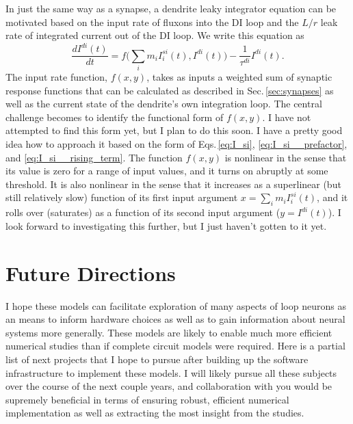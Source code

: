 \documentclass[]{article}
\begin{document}
In just the same way as a synapse, a dendrite leaky integrator equation can be motivated based on the input rate of fluxons into the DI loop and the $L/r$ leak rate of integrated current out of the DI loop. We write this equation as 
\begin{equation}
\label{eq:I_dr}
\frac{dI^{di}(t)}{dt} = f\bigg(\sum_i m_i I_i^{si}(t),I^{di}(t)\bigg)-\frac{1}{\tau^{di}}I^{di}(t).
\end{equation}
The input rate function, $f(x,y)$, takes as inputs a weighted sum of synaptic response functions that can be calculated as described in Sec.\,\ref{sec:synapses} as well as the current state of the dendrite's own integration loop. The central challenge becomes to identify the functional form of $f(x,y)$. I have not attempted to find this form yet, but I plan to do this soon. I have a pretty good idea how to approach it based on the form of Eqs.\,\ref{eq:I_si}, \ref{eq:I_si__prefactor}, and \ref{eq:I_si__rising_term}. The function $f(x,y)$ is nonlinear in the sense that its value is zero for a range of input values, and it turns on abruptly at some threshold. It is also nonlinear in the sense that it increases as a superlinear (but still relatively slow) function of its first input argument $x = \sum_i m_i I_i^{si}(t)$, and it rolls over (saturates) as a function of its second input argument ($y = I^{di}(t)$). I look forward to investigating this further, but I just haven't gotten to it yet.

\section{\label{sec:future_directions}Future Directions}
I hope these models can facilitate exploration of many aspects of loop neurons as an means to inform hardware choices as well as to gain information about neural systems more generally. These models are likely to enable much more efficient numerical studies than if complete circuit models were required. Here is a partial list of next projects that I hope to pursue after building up the software infrastructure to implement these models. I will likely pursue all these subjects over the course of the next couple years, and collaboration with you would be supremely beneficial in terms of ensuring robust, efficient numerical implementation as well as extracting the most insight from the studies. 
\end{document}
